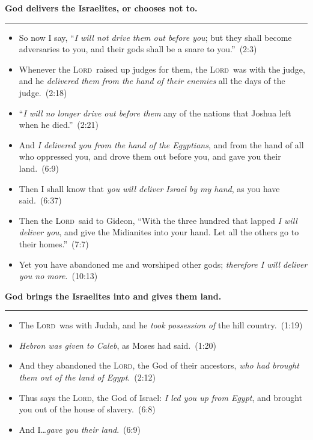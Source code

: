 \documentclass{article}
\newcommand{\godcategory}[1]{\bigskip\noindent \textbf{#1}\smallskip\hrule\nopagebreak}
\newcommand{\Lord}{\textsc{Lord}}
\newcommand{\elips}{\thinspace\ldots}
\begin{document}
\begin{landscape}
\begin{multicols}{3}
\godcategory{God delivers the Israelites, or chooses not to.}
\begin{itemize}
  \item So now I say, “\emph{I will not drive them out before you}; but they shall become adversaries to you, and their gods shall be a snare to you.”~(2:3)
  \item Whenever the \Lord\ raised up judges for them, the \Lord\ was with the judge, and he \emph{delivered them from the hand of their enemies} all the days of the judge.~(2:18)
  \item “\emph{I will no longer drive out before them} any of the nations that Joshua left when he died.”~(2:21)
  \item And \emph{I delivered you from the hand of the Egyptians}, and from the hand of all who oppressed you, and drove them out before you, and gave you their land.~(6:9)
  \item Then I shall know that \emph{you will deliver Israel by my hand}, as you have said.~(6:37)
  \item Then the \Lord\ said to Gideon, “With the three hundred that lapped \emph{I will deliver you}, and give the Midianites into your hand. Let all the others go to their homes.”~(7:7)
  \item Yet you have abandoned me and worshiped other gods; \emph{therefore I will deliver you no more}.~(10:13)
\end{itemize}

\godcategory{God brings the Israelites into and gives them land.}
\begin{itemize}
  \item The \Lord\ was with Judah, and he \emph{took possession of} the hill country.~(1:19)
  \item \emph{Hebron was given to Caleb}, as Moses had said.~(1:20)
  \item And they abandoned the \Lord, the God of their ancestors, \emph{who had brought them out of the land of Egypt}.~(2:12)
  \item Thus says the \Lord, the God of Israel: \emph{I led you up from Egypt}, and brought you out of the house of slavery.~(6:8)
  \item And I\elips \emph{gave you their land}.~(6:9)
\end{itemize}


\end{multicols}
\end{landscape}
\end{document}
